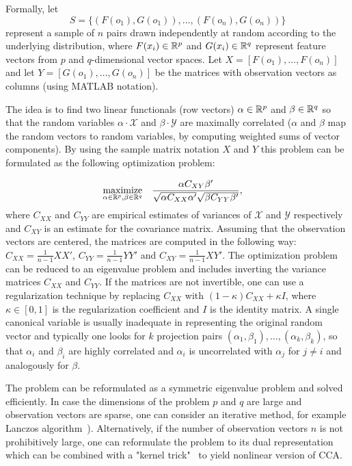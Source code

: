 Formally, let
$$ S = \{ \left( F(o_1), G(o_1) \right), \ldots, \left( F(o_n), G(o_n) \right) \} $$
represent a sample of $n$ pairs drawn independently at random according to the underlying distribution, where $F(x_i) \in \mathbb{R}^p$ and $G(x_i) \in \mathbb{R}^q$ represent feature vectors from $p$ and $q$-dimensional vector spaces. Let $X=[F(o_1), \ldots, F(o_n)]$ and let $Y=[G(o_1), \ldots ,G(o_n)]$ be the matrices with observation vectors as columns (using MATLAB notation).

The idea is to find two linear functionals (row vectors) $\alpha \in \mathbb{R}^p$ and $\beta \in \mathbb{R}^q$ so that the random variables $\alpha \cdot \mathcal{X}$ and $\beta \cdot \mathcal{Y}$ are maximally correlated ($\alpha$ and $\beta$ map the random vectors to random variables, by computing weighted sums of vector components). By using the sample matrix notation $X$ and $Y$ this problem can be formulated as the following optimization problem:

\begin{equation*}
\begin{aligned}
& \underset{\alpha \in \mathbb{R}^{p}, \beta \in \mathbb{R}^{q}}{\text{maximize}}
& & \frac{\alpha C_{XY} \beta'}{\sqrt{\alpha C_{XX} \alpha'} \sqrt{\beta C_{YY} \beta'}},
\end{aligned}
\end{equation*}
where $C_{XX}$ and $C_{YY}$ are empirical estimates of variances of $\mathcal{X}$ and $\mathcal{Y}$ respectively and $C_{XY}$ is an estimate for the covariance matrix. Assuming that the observation vectors are centered, the matrices are computed in the following way: $C_{XX} = \frac{1}{n-1}X X'$, $C_{YY} = \frac{1}{n-1}Y Y'$ and $C_{XY} = \frac{1}{n-1}X Y'$.
The optimization problem can be reduced to an eigenvalue problem and includes inverting the variance matrices $C_{XX}$ and $C_{YY}$. If the matrices are not invertible, one can use a regularization technique by replacing $C_{XX}$ with $(1- \kappa)C_{XX} + \kappa I$, where $\kappa \in [0,1]$ is the regularization coefficient and $I$ is the identity matrix.
A single canonical variable is usually inadequate in representing the original random vector and typically one looks for $k$ projection pairs $(\alpha_1, \beta_1),\ldots,(\alpha_k, \beta_k)$, so that $\alpha_i$ and $\beta_i$ are highly correlated and $\alpha_i$ is uncorrelated with $\alpha_j$  for $j \neq i$ and analogously for $\beta$.

The problem can be reformulated as a symmetric eigenvalue problem and solved efficiently. In case the dimensions of the problem $p$ and $q$ are large and observation vectors are sparse, one can consider an iterative method, for example Lanczos algorithm~\cite{LAL}). Alternatively, if the number of observation vectors $n$ is not prohibitively large, one can reformulate the problem to its dual representation which can be combined with a "kernel trick"~\cite{FBMJ} to yield nonlinear version of CCA.\vspace{-2pt} 
